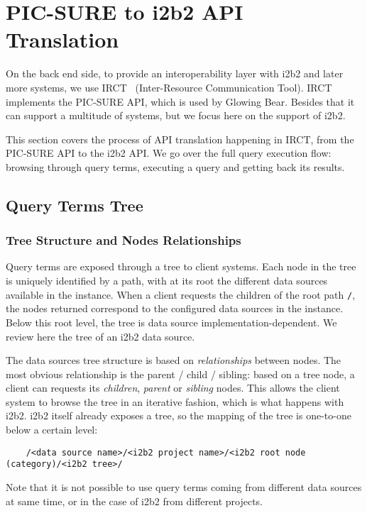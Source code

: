 \section{PIC-SURE to i2b2 API Translation}
\label{sec:interoplayer-picsure}

On the back end side, to provide an interoperability layer with i2b2 and later more systems, we use IRCT~\cite{github:IRCT} (Inter-Resource Communication Tool).
IRCT implements the PIC-SURE API, which is used by Glowing Bear.
Besides that it can support a multitude of systems, but we focus here on the support of i2b2.

This section covers the process of API translation happening in IRCT, from the PIC-SURE API to the i2b2 API.
We go over the full query execution flow: browsing through query terms, executing a query and getting back its results.


\subsection{Query Terms Tree}

\subsubsection{Tree Structure and Nodes Relationships}

Query terms are exposed through a tree to client systems.
Each node in the tree is uniquely identified by a path, with at its root the different data sources available in the instance.
When a client requests the children of the root path \verb|/|, the nodes returned correspond to the configured data sources in the instance.
Below this root level, the tree is data source implementation-dependent.
We review here the tree of an i2b2 data source.

The data sources tree structure is based on \emph{relationships} between nodes.
The most obvious relationship is the parent / child / sibling: based on a tree node, a client can requests its \emph{children}, \emph{parent} or \emph{sibling} nodes.
This allows the client system to browse the tree in an iterative fashion, which is what happens with i2b2.
i2b2 itself already exposes a tree, so the mapping of the tree is one-to-one below a certain level:
\begin{verbatim}
    /<data source name>/<i2b2 project name>/<i2b2 root node (category)/<i2b2 tree>/
\end{verbatim}
Note that it is not possible to use query terms coming from different data sources at same time, or in the case of i2b2 from different projects.

